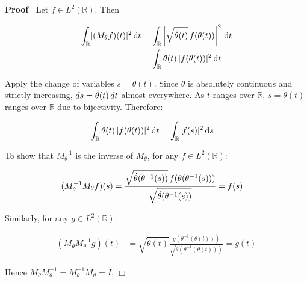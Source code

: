 \documentclass{article}
\newenvironment{proof}{\noindent\textbf{Proof\ }}{\hspace*{\fill}$\Box$\medskip}
\begin{document}
\begin{proof}
  Let $f \in L^2 (\mathbb{R})$. Then
  
  \begin{align}
    \int_{\mathbb{R}} \lvert (M_{\theta} f) (t) \rvert^2 \hspace{0.17em}
    \mathrm{d} t & = \int_{\mathbb{R}} \left| \sqrt{\dot{\theta} (t)} 
    \hspace{0.17em} f (\theta (t)) \right|^2 \hspace{0.17em} \mathrm{d} t \\
    & = \int_{\mathbb{R}} \dot{\theta} (t) \hspace{0.17em} \lvert f (\theta
    (t)) \rvert^2 \hspace{0.17em} \mathrm{d} t 
  \end{align}
  
  Apply the change of variables $s = \theta (t)$. Since $\theta$ is absolutely
  continuous and strictly increasing, $ds = \dot{\theta} (t)  \hspace{0.17em}
  dt$ almost everywhere. As $t$ ranges over $\mathbb{R}$, $s = \theta (t)$
  ranges over $\mathbb{R}$ due to bijectivity. Therefore:
  
  \begin{align}
    \int_{\mathbb{R}} \dot{\theta} (t) \hspace{0.17em} \lvert f (\theta (t))
    \rvert^2 \hspace{0.17em} \mathrm{d} t & = \int_{\mathbb{R}} \lvert f (s)
    \rvert^2 \hspace{0.17em} \mathrm{d} s 
  \end{align}
  
  To show that $M_{\theta}^{- 1}$ is the inverse of $M_{\theta}$, for any $f
  \in L^2 (\mathbb{R})$:
  
  \begin{align}
    (M_{\theta}^{- 1} M_{\theta} f) (s) & = \frac{\sqrt{\dot{\theta}
    (\theta^{- 1} (s))}  \hspace{0.17em} f (\theta (\theta^{- 1}
    (s)))}{\sqrt{\dot{\theta} (\theta^{- 1} (s))}} = f (s) 
  \end{align}
  
  Similarly, for any $g \in L^2 (\mathbb{R})$:
  
  \begin{align}
    (M_{\theta} M_{\theta}^{- 1} g) (t) & = \sqrt{\dot{\theta} (t)}  \frac{g
    (\theta^{- 1} (\theta (t)))}{\sqrt{\dot{\theta} (\theta^{- 1} (\theta
    (t)))}} = g (t) 
  \end{align}
  
  Hence $M_{\theta} M_{\theta}^{- 1} = M_{\theta}^{- 1} M_{\theta} = I$.
\end{proof}
\end{document}
